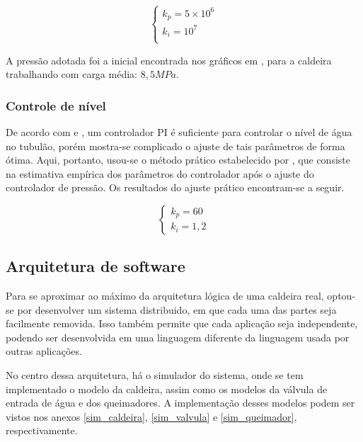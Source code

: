 \begin{equation}
  \begin{cases}
    k_p = 5\times10^6\\
    k_i = 10^7\\
  \end{cases}
  \label{ks_pi_pressao}
\end{equation}

A pressão adotada foi a inicial encontrada nos gráficos em
, para a caldeira trabalhando com carga média:
$8,5 MPa$.

\subsubsection{Controle de nível}

De acordo com  e , um
controlador PI é suficiente para controlar o nível de água no tubulão,
porém mostra-se complicado o ajuste de tais parâmetros de forma
ótima. Aqui, portanto, usou-se o método prático estabelecido por
, que consiste na estimativa empírica dos parâmetros
do controlador após o ajuste do controlador de pressão. Os resultados
do ajuste prático encontram-se a seguir.

\begin{equation}
  \begin{cases}
    k_p=60\\
    k_i=1,2
  \end{cases}
  \label{ks_pid_agua}
\end{equation}

\subsection{Arquitetura de software}

Para se aproximar ao máximo da arquitetura lógica de uma caldeira
real, optou-se por desenvolver um sistema distribuido, em que cada uma
das partes seja facilmente removida. Isso também permite que cada
aplicação seja independente, podendo ser desenvolvida em uma linguagem
diferente da linguagem usada por outras aplicações.

No centro dessa arquitetura, há o simulador do sistema, onde se tem
implementado o modelo da caldeira, assim como os modelos da válvula de
entrada de água e dos queimadores. A implementação desses modelos
podem ser vistos nos anexos \ref{sim_caldeira}, \ref{sim_valvula} e
\ref{sim_queimador}, respectivamente.

